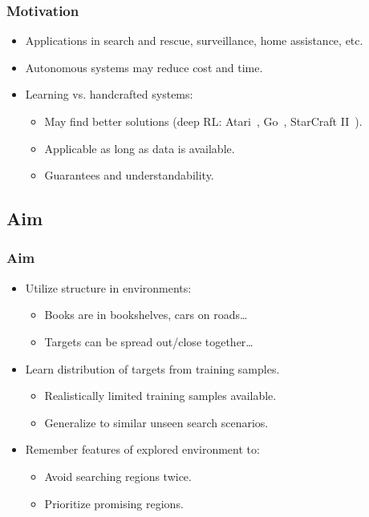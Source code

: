 \begin{frame}
    \frametitle{Motivation}
    
    \begin{itemize}
        \item Applications in search and rescue, surveillance, home assistance, etc.
        \item Autonomous systems may reduce cost and time.
        \item Learning vs. handcrafted systems:
        \begin{itemize}
            \item May find better solutions (deep RL: Atari~\cite{mnih_human-level_2015}, Go~\cite{silver_mastering_2016}, StarCraft II~\cite{vinyals_grandmaster_2019}).
            \item Applicable as long as data is available.
            \item Guarantees and understandability.
        \end{itemize}
    \end{itemize}
\end{frame}

\subsection{Aim}

\begin{frame}
    \frametitle{Aim}
    
    \begin{itemize}
        \item Utilize structure in environments:
        \begin{itemize}
            \item Books are in bookshelves, cars on roads\dots
            \item Targets can be spread out/close together\dots
        \end{itemize}
        \item Learn distribution of targets from training samples.
        \begin{itemize}
            \item Realistically limited training samples available.
            \item Generalize to similar unseen search scenarios.
        \end{itemize}
        \item Remember features of explored environment to:
        \begin{itemize}
            \item Avoid searching regions twice.
            \item Prioritize promising regions.
        \end{itemize}
    \end{itemize}
\end{frame}


